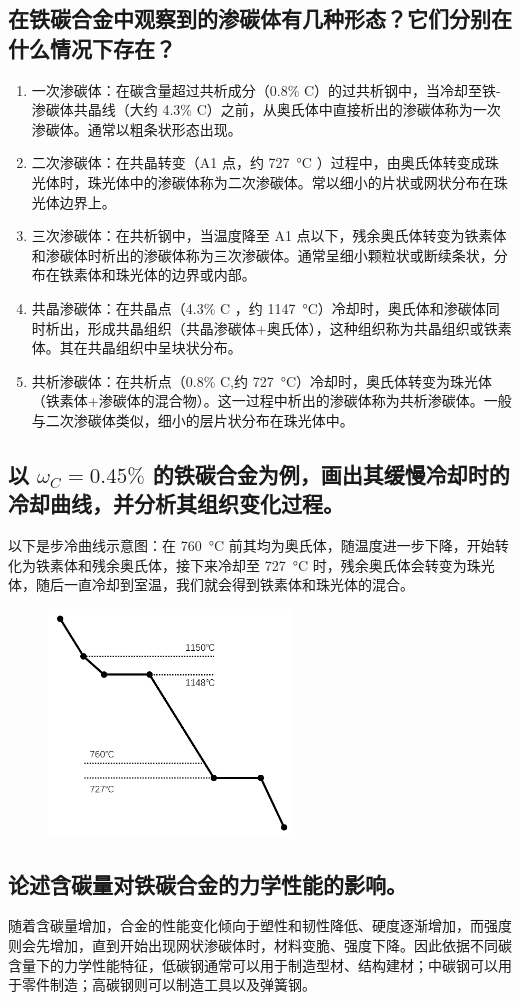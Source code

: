 \documentclass[a4paper,utf8]{article}
\begin{document}
    \subsection{在铁碳合金中观察到的渗碳体有几种形态？它们分别在什么情况下存在？}
        \begin{enumerate}
            \item 一次渗碳体：在碳含量超过共析成分（0.8\% C）的过共析钢中，当冷却至铁-渗碳体共晶线（大约 4.3\% C）之前，从奥氏体中直接析出的渗碳体称为一次渗碳体。通常以粗条状形态出现。
            \item 二次渗碳体：在共晶转变（A1 点，约 \SI{727}{\degreeCelsius} ）过程中，由奥氏体转变成珠光体时，珠光体中的渗碳体称为二次渗碳体。常以细小的片状或网状分布在珠光体边界上。
            \item 三次渗碳体：在共析钢中，当温度降至 A1 点以下，残余奥氏体转变为铁素体和渗碳体时析出的渗碳体称为三次渗碳体。通常呈细小颗粒状或断续条状，分布在铁素体和珠光体的边界或内部。
            \item 共晶渗碳体：在共晶点（4.3\% C ，约 \SI{1147}{\degreeCelsius}）冷却时，奥氏体和渗碳体同时析出，形成共晶组织（共晶渗碳体+奥氏体），这种组织称为共晶组织或铁素体。其在共晶组织中呈块状分布。
            \item 共析渗碳体：在共析点（0.8\% C,约 \SI{727}{\degreeCelsius}）冷却时，奥氏体转变为珠光体（铁素体+渗碳体的混合物）。这一过程中析出的渗碳体称为共析渗碳体。一般与二次渗碳体类似，细小的层片状分布在珠光体中。
        \end{enumerate}\newpage
    \subsection{以 $\omega_C=0.45\%$ 的铁碳合金为例，画出其缓慢冷却时的冷却曲线，并分析其组织变化过程。}
        以下是步冷曲线示意图：在 \SI{760}{\degreeCelsius} 前其均为奥氏体，随温度进一步下降，开始转化为铁素体和残余奥氏体，接下来冷却至 \SI{727}{\degreeCelsius} 时，残余奥氏体会转变为珠光体，随后一直冷却到室温，我们就会得到铁素体和珠光体的混合。\par
        \begin{figure}[!ht]
            \includegraphics[height=60mm]{sk1.png}
        \end{figure}
    \subsection{论述含碳量对铁碳合金的力学性能的影响。}
        随着含碳量增加，合金的性能变化倾向于塑性和韧性降低、硬度逐渐增加，而强度则会先增加，直到开始出现网状渗碳体时，材料变脆、强度下降。因此依据不同碳含量下的力学性能特征，低碳钢通常可以用于制造型材、结构建材；中碳钢可以用于零件制造；高碳钢则可以制造工具以及弹簧钢。
\end{document}

